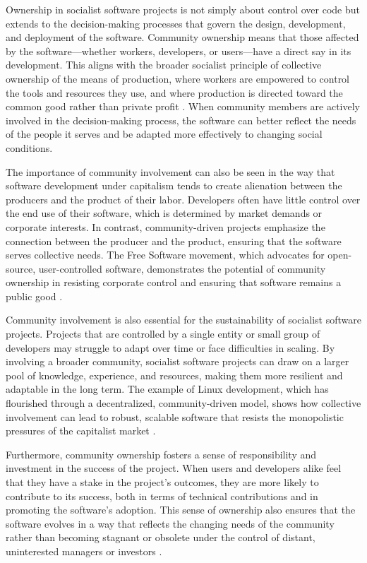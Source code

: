 \begin{refsection}
Ownership in socialist software projects is not simply about control over code but extends to the decision-making processes that govern the design, development, and deployment of the software. Community ownership means that those affected by the software—whether workers, developers, or users—have a direct say in its development. This aligns with the broader socialist principle of collective ownership of the means of production, where workers are empowered to control the tools and resources they use, and where production is directed toward the common good rather than private profit \cite[pp.~45-50]{marx1867}. When community members are actively involved in the decision-making process, the software can better reflect the needs of the people it serves and be adapted more effectively to changing social conditions.

The importance of community involvement can also be seen in the way that software development under capitalism tends to create alienation between the producers and the product of their labor. Developers often have little control over the end use of their software, which is determined by market demands or corporate interests. In contrast, community-driven projects emphasize the connection between the producer and the product, ensuring that the software serves collective needs. The Free Software movement, which advocates for open-source, user-controlled software, demonstrates the potential of community ownership in resisting corporate control and ensuring that software remains a public good \cite[pp.~78-82]{stallman2002}.

Community involvement is also essential for the sustainability of socialist software projects. Projects that are controlled by a single entity or small group of developers may struggle to adapt over time or face difficulties in scaling. By involving a broader community, socialist software projects can draw on a larger pool of knowledge, experience, and resources, making them more resilient and adaptable in the long term. The example of Linux development, which has flourished through a decentralized, community-driven model, shows how collective involvement can lead to robust, scalable software that resists the monopolistic pressures of the capitalist market \cite[pp.~145-148]{raymond2022}.

Furthermore, community ownership fosters a sense of responsibility and investment in the success of the project. When users and developers alike feel that they have a stake in the project’s outcomes, they are more likely to contribute to its success, both in terms of technical contributions and in promoting the software’s adoption. This sense of ownership also ensures that the software evolves in a way that reflects the changing needs of the community rather than becoming stagnant or obsolete under the control of distant, uninterested managers or investors \cite[pp.~63-67]{ernesto1968}.


\end{refsection}
